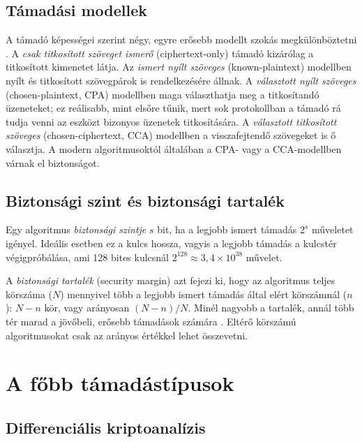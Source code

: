 \documentclass[a4paper,12pt]{report}
\theoremstyle{definition}
\theoremstyle{remark}
\begin{document}
\subsection{Támadási modellek}

A támadó képességei szerint négy, egyre erősebb modellt szokás megkülönböztetni \cite{Stallings2017}. A \emph{csak titkosított szöveget ismerő} (ciphertext-only) támadó kizárólag a titkosított kimenetet látja. Az \emph{ismert nyílt szöveges} (known-plaintext) modellben nyílt és titkosított szövegpárok is rendelkezésére állnak. A \emph{választott nyílt szöveges} (chosen-plaintext, CPA) modellben maga választhatja meg a titkosítandó üzeneteket; ez reálisabb, mint elsőre tűnik, mert sok protokollban a támadó rá tudja venni az eszközt bizonyos üzenetek titkosítására. A \emph{választott titkosított szöveges} (chosen-ciphertext, CCA) modellben a visszafejtendő szövegeket is ő választja. A modern algoritmusoktól általában a CPA- vagy a CCA-modellben várnak el biztonságot.

\subsection{Biztonsági szint és biztonsági tartalék}

Egy algoritmus \emph{biztonsági szintje} $s$ bit, ha a legjobb ismert támadás $2^s$ műveletet igényel. Ideális esetben ez a kulcs hossza, vagyis a legjobb támadás a kulcstér végigpróbálása, ami 128 bites kulcsnál $2^{128} \approx 3{,}4 \times 10^{38}$ művelet.

A \emph{biztonsági tartalék} (security margin) azt fejezi ki, hogy az algoritmus teljes körszáma ($N$) mennyivel több a legjobb ismert támadás által elért körszámnál ($n$): $N - n$ kör, vagy arányosan $(N-n)/N$. Minél nagyobb a tartalék, annál több tér marad a jövőbeli, erősebb támadások számára \cite{Biryukov2017}. Eltérő körszámú algoritmusokat csak az arányos értékkel lehet összevetni.

\section{A főbb támadástípusok}\label{sec:tamadastipusok}

\subsection{Differenciális kriptoanalízis}
\end{document}

